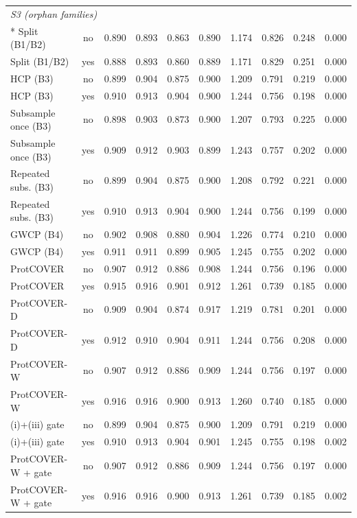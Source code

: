 \begin{longtable}{lccccccccc}
\midrule
\multicolumn{10}{l}{\emph{S3 (orphan families)}}\\*
Split (B1/B2) & no & 0.890 & 0.893 & 0.863 & 0.890 & 1.174 & 0.826 & 0.248 & 0.000 \\
Split (B1/B2) & yes & 0.888 & 0.893 & 0.860 & 0.889 & 1.171 & 0.829 & 0.251 & 0.000 \\
HCP (B3) & no & 0.899 & 0.904 & 0.875 & 0.900 & 1.209 & 0.791 & 0.219 & 0.000 \\
HCP (B3) & yes & 0.910 & 0.913 & 0.904 & 0.900 & 1.244 & 0.756 & 0.198 & 0.000 \\
Subsample once (B3) & no & 0.898 & 0.903 & 0.873 & 0.900 & 1.207 & 0.793 & 0.225 & 0.000 \\
Subsample once (B3) & yes & 0.909 & 0.912 & 0.903 & 0.899 & 1.243 & 0.757 & 0.202 & 0.000 \\
Repeated subs. (B3) & no & 0.899 & 0.904 & 0.875 & 0.900 & 1.208 & 0.792 & 0.221 & 0.000 \\
Repeated subs. (B3) & yes & 0.910 & 0.913 & 0.904 & 0.900 & 1.244 & 0.756 & 0.199 & 0.000 \\
GWCP (B4) & no & 0.902 & 0.908 & 0.880 & 0.904 & 1.226 & 0.774 & 0.210 & 0.000 \\
GWCP (B4) & yes & 0.911 & 0.911 & 0.899 & 0.905 & 1.245 & 0.755 & 0.202 & 0.000 \\
ProtCOVER & no & 0.907 & 0.912 & 0.886 & 0.908 & 1.244 & 0.756 & 0.196 & 0.000 \\
ProtCOVER & yes & 0.915 & 0.916 & 0.901 & 0.912 & 1.261 & 0.739 & 0.185 & 0.000 \\
ProtCOVER-D & no & 0.909 & 0.904 & 0.874 & 0.917 & 1.219 & 0.781 & 0.201 & 0.000 \\
ProtCOVER-D & yes & 0.912 & 0.910 & 0.904 & 0.911 & 1.244 & 0.756 & 0.208 & 0.000 \\
ProtCOVER-W & no & 0.907 & 0.912 & 0.886 & 0.909 & 1.244 & 0.756 & 0.197 & 0.000 \\
ProtCOVER-W & yes & 0.916 & 0.916 & 0.900 & 0.913 & 1.260 & 0.740 & 0.185 & 0.000 \\
(i)+(iii) gate & no & 0.899 & 0.904 & 0.875 & 0.900 & 1.209 & 0.791 & 0.219 & 0.000 \\
(i)+(iii) gate & yes & 0.910 & 0.913 & 0.904 & 0.901 & 1.245 & 0.755 & 0.198 & 0.002 \\
ProtCOVER-W + gate & no & 0.907 & 0.912 & 0.886 & 0.909 & 1.244 & 0.756 & 0.197 & 0.000 \\
ProtCOVER-W + gate & yes & 0.916 & 0.916 & 0.900 & 0.913 & 1.261 & 0.739 & 0.185 & 0.002 \\

\end{longtable}
